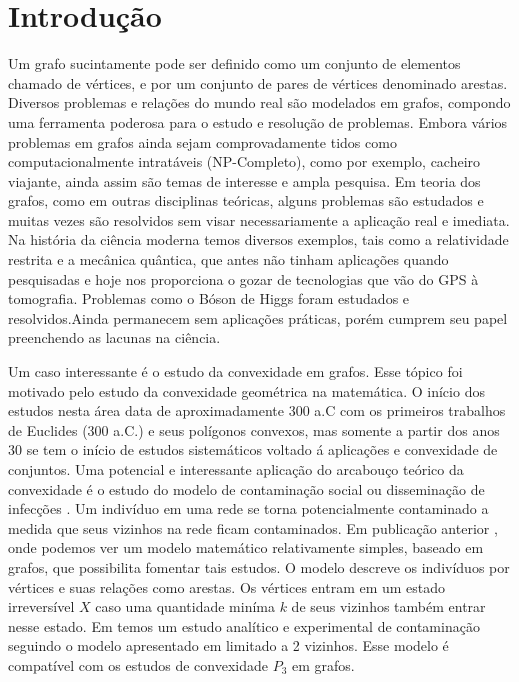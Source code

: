 \chapter{Introdução}
\label{cap:intro}

Um grafo sucintamente pode ser definido como um conjunto de elementos chamado de vértices, e por um conjunto de pares de vértices denominado arestas. Diversos problemas e relações do mundo real são modelados em grafos,
compondo uma ferramenta poderosa para o estudo e resolução de problemas. Embora vários problemas em grafos ainda sejam comprovadamente tidos como computacionalmente intratáveis (NP-Completo), como por exemplo, cacheiro viajante\cite{Biggs1986}, ainda assim são temas de interesse e ampla pesquisa. Em teoria dos grafos, como em outras disciplinas teóricas, alguns problemas são estudados e muitas vezes são resolvidos sem visar necessariamente a aplicação real e imediata. Na história da ciência moderna temos diversos exemplos, tais como a relatividade restrita e a mecânica quântica, que antes não tinham aplicações quando pesquisadas e hoje nos proporciona o gozar de tecnologias que vão do GPS à tomografia. Problemas como o Bóson de Higgs\cite{Higgs1964} foram estudados e resolvidos.Ainda permanecem sem aplicações práticas, porém cumprem seu papel preenchendo as lacunas na ciência.

Um caso interessante é o estudo da convexidade em grafos. Esse tópico foi motivado pelo estudo da convexidade geométrica na matemática. O início dos estudos nesta área data de aproximadamente 300 a.C
com os primeiros trabalhos de Euclides (300 a.C.) e seus polígonos convexos, mas somente a partir dos anos 30 se tem o início de estudos sistemáticos voltado á aplicações e convexidade de conjuntos.
Uma potencial e interessante aplicação do arcabouço teórico da convexidade
é o estudo do modelo de contaminação social ou disseminação de infecções \cite{Hodas2014}. Um indivíduo em uma rede se torna potencialmente contaminado a medida que seus vizinhos na rede ficam contaminados. Em publicação anterior \cite{Dreyer2009}, onde podemos ver um modelo matemático relativamente simples, baseado em grafos, que possibilita fomentar tais estudos. O modelo descreve os indivíduos por vértices e suas relações como arestas. Os vértices entram em um estado irreversível $X$ caso uma quantidade miníma $k$ de seus vizinhos também entrar nesse estado. Em \cite{Kuhlman2011} temos um estudo analítico e experimental de contaminação seguindo o modelo apresentado em \cite{Dreyer2009} limitado a 2 vizinhos. Esse modelo é compatível com os estudos de convexidade $P_3$ em grafos.

